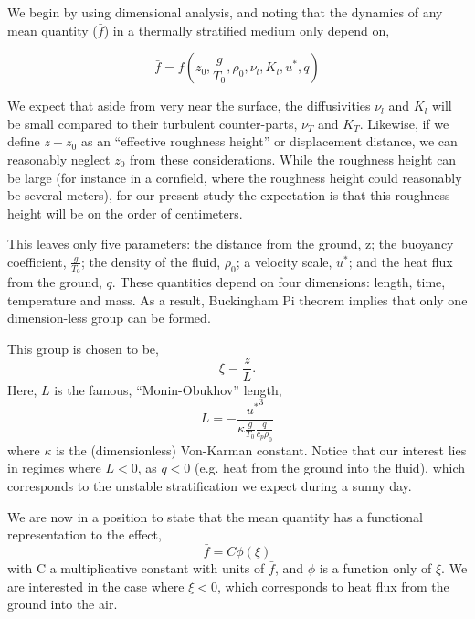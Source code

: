 %
%

We begin by using dimensional analysis, and noting that the dynamics of
any mean quantity ($\bar f$) in a thermally stratified medium only depend on,

\begin{equation}
\bar f = f(z_0,\frac{g}{T_0},\rho_0,\nu_l,K_l,u^*,q)
\end{equation}

We expect that aside from very near the surface, the diffusivities $\nu_l$
and $K_l$ will be small compared to their turbulent counter-parts, $\nu_T$
and $K_T$. Likewise, if we define $z-z_0$ as an ``effective roughness
height'' or displacement distance, we can reasonably neglect $z_0$ from these
considerations. While the roughness height can be large (for instance in
a cornfield, where the roughness height could reasonably be several
meters), for our present study the expectation is that this roughness
height will be on the order of centimeters\cite{oke1987boundary}. 

This leaves only five parameters: the distance from the ground, z; the
buoyancy coefficient, $\frac{g}{T_0}$; the density of the fluid,
$\rho_0$; a velocity scale, $u^*$; and the heat flux from the ground,
$q$. 
%
% 
These quantities depend on
four dimensions: length, time, temperature and mass. As a result, 
Buckingham Pi theorem implies that only one dimension-less group can be
formed\cite{munson2012fundamentals}.%

This group is chosen to be,
\begin{equation}
 \xi = \frac{z}{L}.
\end{equation}
Here, $L$ is the famous, ``Monin-Obukhov'' length,
\begin{equation}
 L = -\frac{{u^*}^3}{\kappa \frac{g}{T_0} \frac{q}{c_p \rho_0}}
\end{equation}
where $\kappa$ is the (dimensionless) Von-Karman constant. Notice that
our interest lies in regimes where $L<0$, as $q<0$ (e.g. heat from the
ground into the fluid), which corresponds to the unstable stratification 
we expect during a sunny day. 

We are now in a position to state that the mean quantity has a
functional representation to the effect,
\begin{equation}
 \bar f = C \phi(\xi)
\end{equation}
with C a multiplicative constant with units of $\bar f$, and $\phi$ is a
function only of $\xi$. We are interested in the case where $\xi<0$, which
corresponds to heat flux from the ground into the air.  

